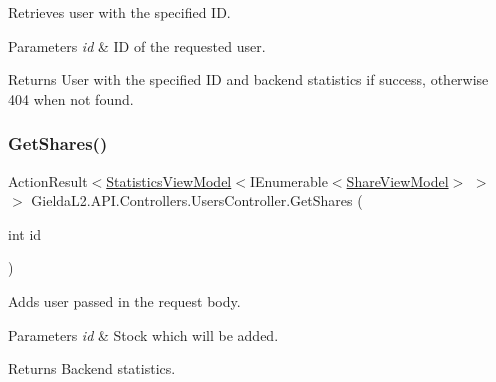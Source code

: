 Retrieves user with the specified ID. 


\begin{DoxyParams}{Parameters}
{\em id} & ID of the requested user.\\
\hline
\end{DoxyParams}
\begin{DoxyReturn}{Returns}
User with the specified ID and backend statistics if success, otherwise 404 when not found.
\end{DoxyReturn}
\mbox{\label{class_gielda_l2_1_1_a_p_i_1_1_controllers_1_1_users_controller_adbf0440fe0cc3b28ce771a1808e21d8c}} 
\subsubsection{\texorpdfstring{GetShares()}{GetShares()}}
{\footnotesize\ttfamily Action\+Result$<$\mbox{\hyperlink{class_gielda_l2_1_1_a_p_i_1_1_view_models_1_1_view_1_1_statistics_view_model}{Statistics\+View\+Model}}$<$I\+Enumerable$<$\mbox{\hyperlink{class_gielda_l2_1_1_a_p_i_1_1_view_models_1_1_view_1_1_share_view_model}{Share\+View\+Model}}$>$ $>$ $>$ Gielda\+L2.\+A\+P\+I.\+Controllers.\+Users\+Controller.\+Get\+Shares (\begin{DoxyParamCaption}\item[{int}]{id }\end{DoxyParamCaption})}



Adds user passed in the request body. 


\begin{DoxyParams}{Parameters}
{\em id} & Stock which will be added.\\
\hline
\end{DoxyParams}
\begin{DoxyReturn}{Returns}
Backend statistics.
\end{DoxyReturn}
\mbox{\label{class_gielda_l2_1_1_a_p_i_1_1_controllers_1_1_users_controller_a75e8fafc661b2159421b40427f627a92}} 
